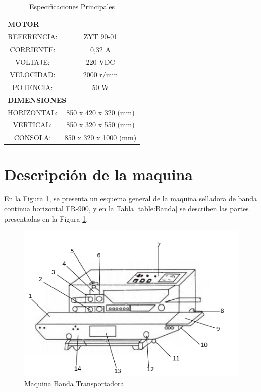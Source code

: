 \begin{table}[ht]
	\centering
	\begin{tabular}{|c|c|c|c|}
		\hline
		\multicolumn{4}{|l|}{\textbf{MOTOR}} \bigstrut\\
		\hline
		\multicolumn{2}{|c|}{REFERENCIA:} & \multicolumn{2}{c|}{ZYT 90-01} \bigstrut\\
		\hline
		\multicolumn{2}{|c|}{CORRIENTE:} & \multicolumn{2}{c|}{0,32 A} \bigstrut\\
		\hline
		\multicolumn{2}{|c|}{VOLTAJE:} & \multicolumn{2}{c|}{220 VDC} \bigstrut\\
		\hline
		\multicolumn{2}{|c|}{VELOCIDAD:} & \multicolumn{2}{c|}{2000 r/min} \bigstrut\\
		\hline
		\multicolumn{2}{|c|}{POTENCIA:} & \multicolumn{2}{c|}{50 W} \bigstrut\\
		\hline
		\multicolumn{4}{|l|}{\textbf{DIMENSIONES}} \bigstrut\\
		\hline
		\multicolumn{2}{|c|}{HORIZONTAL:} & \multicolumn{2}{c|}{850 x 420 x 320 (mm)} \bigstrut\\
		\hline
		\multicolumn{2}{|c|}{VERTICAL:} & \multicolumn{2}{c|}{850 x 320 x 550 (mm)} \bigstrut\\
		\hline
		\multicolumn{2}{|c|}{CONSOLA:} & \multicolumn{2}{c|}{850 x 320 x 1000 (mm)} \bigstrut\\
		\hline
	\end{tabular}%
	\caption{Especificaciones Principales}
	\label{fig:principales}
\end{table}%


\newpage
\section{Descripción de la maquina}
En la Figura \ref{fig:Banda}, se presenta un esquema general de la maquina selladora de banda continua horizontal FR-900, y en la Tabla \ref{table:Banda} se describen las partes presentadas en la Figura \ref{fig:Banda}.
\begin{figure}[ht]
	\centering
	\includegraphics[scale=0.95]{Figs/65.png}
	\caption{Maquina Banda Transportadora}
	\label{fig:Banda}
\end{figure}

